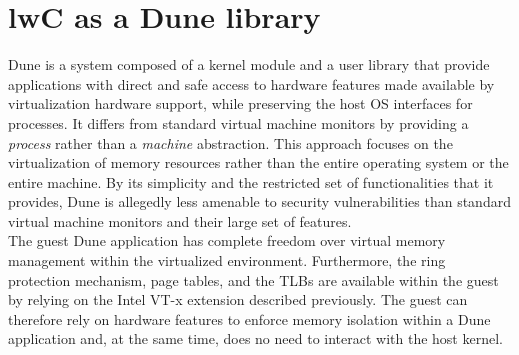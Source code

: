 \documentclass[letterpaper,twocolumn,10pt]{article}
\begin{document}
%
%
%
%

\section{lwC as a Dune library}

Dune is a system composed of a kernel module and a user library that provide applications with direct and safe access to hardware features made available by virtualization hardware support, while preserving the host OS interfaces for processes.
It differs from standard virtual machine monitors by providing a \emph{process} rather than a \emph{machine} abstraction. 
This approach focuses on the virtualization of memory resources rather than the entire operating system or the entire machine.
By its simplicity and the restricted set of functionalities that it provides, Dune is allegedly less amenable to security vulnerabilities than standard virtual machine monitors and their large set of features.\\

The guest Dune application has complete freedom over virtual memory management within the virtualized environment.
Furthermore, the ring protection mechanism, page tables, and the TLBs are available within the guest by relying on the Intel VT-x extension described previously.
The guest can therefore rely on hardware features to enforce memory isolation within a Dune application and, at the same time, does no need to interact with the host kernel.
\end{document}

